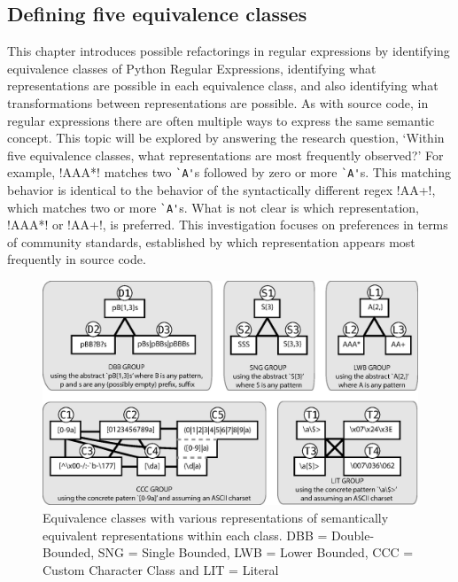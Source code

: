 \subsection{Defining five equivalence classes}
\label{sec:equivClasses}

This chapter introduces possible refactorings in regular expressions by identifying equivalence classes of Python Regular Expressions, identifying what representations are possible in each equivalence class, and also identifying what transformations between representations are possible. As with source code, in regular expressions there are often multiple ways to express the same semantic concept.
This topic will be explored by answering the research question, `Within five equivalence classes, what representations are most frequently observed?'
For example, \cverb!AAA*! matches two \verb!`A'!s followed by zero or more \verb!`A'!s.  This matching behavior is identical to the behavior of the syntactically different regex \cverb!AA+!, which matches two or more \verb!`A'!s.  What is not clear is which representation,  \cverb!AAA*!  or  \cverb!AA+!, is preferred.  This investigation focuses on preferences in terms of community standards, established by which representation appears most frequently in source code.

\begin{figure}[tb]
\centering
\includegraphics[width=\textwidth]{nontex/illustrations/refactoringTree.eps}
\vspace{-12pt}
\caption{Equivalence classes with various representations of semantically equivalent representations within each class. DBB = Double-Bounded, SNG = Single Bounded, LWB = Lower Bounded, CCC = Custom Character Class and LIT = Literal}
\vspace{-6pt}
\label{fig:refactoringTree}
\end{figure}


